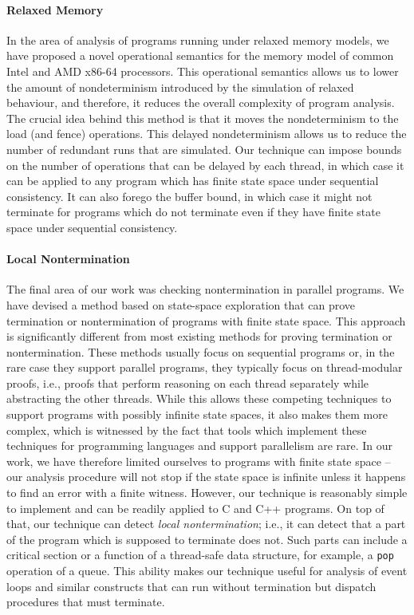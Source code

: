 \paragraph{Relaxed Memory}

In the area of analysis of programs running under relaxed memory models, we have proposed a novel operational semantics for the \xtso memory model of common Intel and AMD x86-64 processors.
This operational semantics allows us to lower the amount of nondeterminism introduced by the simulation of relaxed behaviour, and therefore, it reduces the overall complexity of program analysis.
The crucial idea behind this method is that it moves the nondeterminism to the load (and fence) operations.
This delayed nondeterminism allows us to reduce the number of redundant runs that are simulated.
Our technique can impose bounds on the number of operations that can be delayed by each thread, in which case it can be applied to any program which has finite state space under sequential consistency.
It can also forego the buffer bound, in which case it might not terminate for programs which do not terminate even if they have finite state space under sequential consistency.

\paragraph{Local Nontermination}

The final area of our work was checking nontermination in parallel programs.
We have devised a method based on state-space exploration that can prove termination or nontermination of programs with finite state space.
This approach is significantly different from most existing methods for proving termination or nontermination.
These methods usually focus on sequential programs or, in the rare case they support parallel programs, they typically focus on thread-modular proofs, i.e., proofs that perform reasoning on each thread separately while abstracting the other threads.
While this allows these competing techniques to support programs with possibly infinite state spaces, it also makes them more complex, which is witnessed by the fact that tools which implement these techniques for programming languages and support parallelism are rare.
In our work, we have therefore limited ourselves to programs with finite state space -- our analysis procedure will not stop if the state space is infinite unless it happens to find an error with a finite witness.
However, our technique is reasonably simple to implement and can be readily applied to C and C++ programs.
On top of that, our technique can detect \emph{local nontermination}; i.e., it can detect that a part of the program which is supposed to terminate does not.
Such parts can include a critical section or a function of a thread-safe data structure, for example, a \texttt{pop} operation of a queue.
This ability makes our technique useful for analysis of event loops and similar constructs that can run without termination but dispatch procedures that must terminate.

